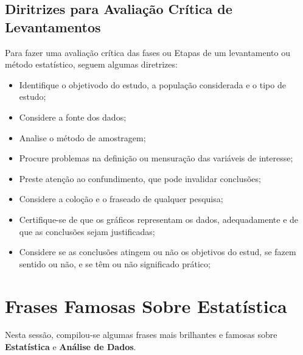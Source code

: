 \subsection{Diritrizes para Avaliação Crítica de Levantamentos}

\inic Para  fazer uma avaliação crítica das fases ou Etapas de um levantamento ou método estatístico, seguem algumas diretrizes:

\begin{itemize}
    \item Identifique o objetivodo do estudo, a população considerada e o tipo de estudo;
    \item Considere a fonte dos dados;
    \item Analise o método de amostragem;
    \item Procure problemas na definição ou mensuração das variáveis de interesse;
    \item Preste atenção ao confundimento, que pode invalidar conclusões;
    \item Considere a coloção e o fraseado de qualquer pesquisa;
    \item Certifique-se de que os gráficos representam os dados, adequadamente e de que as conclusões sejam justificadas;
    \item Considere se as conclusões atingem ou não os objetivos do estud, se fazem sentido ou não, e se têm ou não significado prático;
\end{itemize}




\section{Frases Famosas Sobre Estatística}

Nesta sessão, compilou-se algumas frases mais brilhantes e famosas sobre \textbf{Estatística} e \textbf{Análise de Dados}.

